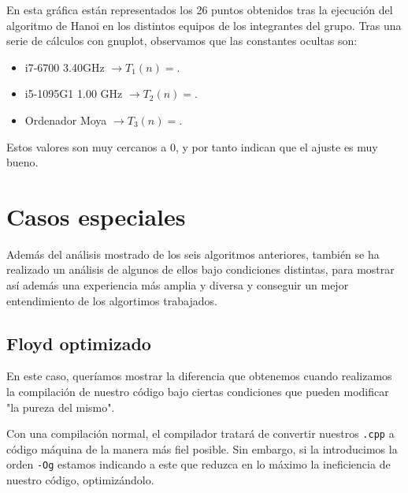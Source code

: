\documentclass[10pt,a4paper]{article}
\begin{document}
En esta gráfica están representados los 26 puntos obtenidos tras la ejecución del algoritmo de Hanoi en los distintos equipos de los integrantes del grupo. Tras una serie de cálculos con gnuplot, observamos que las constantes ocultas son:
\begin{itemize}
	\item i7-6700 3.40GHz \(\rightarrow T_1(n) =\).
	\item i5-1095G1 1.00 GHz \(\rightarrow T_2(n) =\).
	\item Ordenador Moya \(\rightarrow T_3(n) =\).
\end{itemize}

Estos valores son muy cercanos a 0, y por tanto indican que el ajuste es muy bueno.

\section{Casos especiales}

Además del análisis mostrado de los seis algoritmos anteriores, también se ha realizado un análisis de algunos de ellos bajo condiciones distintas, para mostrar así además una experiencia más amplia y diversa y conseguir un mejor entendimiento de los algortimos trabajados.

\subsection{Floyd optimizado}

En este caso, queríamos mostrar la diferencia que obtenemos cuando realizamos la compilación de nuestro código bajo ciertas condiciones que pueden modificar "la pureza del mismo". 

Con una compilación normal, el compilador tratará de convertir nuestros \texttt{.cpp} a código máquina de la manera más fiel posible. Sin embargo, si la introducimos la orden \texttt{-Og} estamos indicando a este que reduzca en lo máximo la ineficiencia de nuestro código, optimizándolo.
\end{document}
